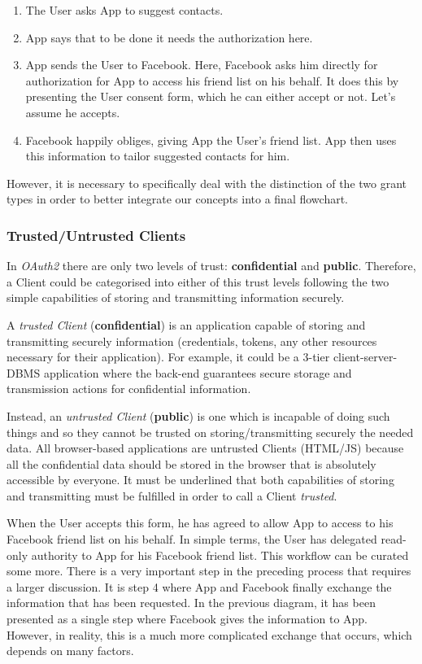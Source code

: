 \documentclass[a4paper,12pt]{article}
\def\oauth{OAuth2\xspace}
\begin{document}
\begin{enumerate}
    \item The User asks App to suggest contacts.
    \item App says that to be done it needs the authorization here.
    \item App sends the User to Facebook. Here, Facebook asks him directly for authorization for App to access his friend list on his behalf. It does this by presenting the User consent form, which he can either accept or not. Let's assume he accepts.
    \item Facebook happily obliges, giving App the User's friend list. App then uses this information to tailor suggested contacts for him.
\end{enumerate}

However, it is necessary to specifically deal with the distinction of the two grant types in order to better integrate our concepts into a final flowchart.

\subsubsection{Trusted/Untrusted Clients}

In \textit{\oauth} there are only two levels of trust: \textbf{confidential} and \textbf{public}. 
Therefore, a Client could be categorised into either of this trust levels following the two simple capabilities of storing and transmitting information securely.

A \textit{trusted Client} (\textbf{confidential}) is an application capable of storing and transmitting securely information (credentials, tokens, any other resources necessary for their application).
For example, it could be a 3-tier client-server-DBMS application where the back-end guarantees secure storage and transmission actions for confidential information. 

Instead, an \textit{untrusted Client} (\textbf{public}) is one which is incapable of doing such things and so they cannot be trusted on storing/transmitting securely the needed data. All browser-based applications are untrusted Clients (HTML/JS) because all the confidential data should be stored in the browser that is absolutely accessible by everyone.
It must be underlined that both capabilities of storing and transmitting must be fulfilled in order to call a Client \textit{trusted}.

When the User accepts this form, he has agreed to allow App to access to his Facebook friend list on his behalf. In simple terms, the User has delegated read-only authority to App for his Facebook friend list.
This workflow can be curated some more. There is a very important step in the
preceding process that requires a larger discussion. It is step 4 where App and
Facebook finally exchange the information that has been requested. In the previous diagram, it has been presented as a single step where Facebook gives the information to App. However, in reality, this is a much more complicated exchange that occurs, which depends on many factors.
\end{document}
